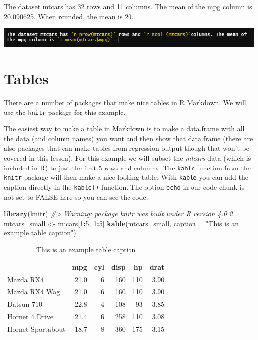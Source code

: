 \documentclass[
  12pt,
]{book}
\newenvironment{Shaded}{\begin{snugshade}}{\end{snugshade}}
\newcommand{\CommentTok}[1]{\textcolor[rgb]{0.56,0.35,0.01}{\textit{#1}}}
\newcommand{\DataTypeTok}[1]{\textcolor[rgb]{0.13,0.29,0.53}{#1}}
\newcommand{\DecValTok}[1]{\textcolor[rgb]{0.00,0.00,0.81}{#1}}
\newcommand{\KeywordTok}[1]{\textcolor[rgb]{0.13,0.29,0.53}{\textbf{#1}}}
\newcommand{\NormalTok}[1]{#1}
\newcommand{\OperatorTok}[1]{\textcolor[rgb]{0.81,0.36,0.00}{\textbf{#1}}}
\newcommand{\StringTok}[1]{\textcolor[rgb]{0.31,0.60,0.02}{#1}}
\begin{document}
The dataset mtcars has 32 rows and 11 columns. The mean of the mpg column is 20.090625. When rounded, the mean is 20.

\includegraphics{images/inline_code.PNG}

\hypertarget{tables}{%
\section{Tables}\label{tables}}

There are a number of packages that make nice tables in R Markdown. We will use the \texttt{knitr} package for this example.

The easiest way to make a table in Markdown is to make a data.frame with all the data (and column names) you want and then show that data.frame (there are also packages that can make tables from regression output though that won't be covered in this lesson). For this example we will subset the \emph{mtcars} data (which is included in R) to just the first 5 rows and columns. The \texttt{kable} function from the \texttt{knitr} package will then make a nice looking table. With \texttt{kable} you can add the caption directly in the \texttt{kable()} function. The option \texttt{echo} in our code chunk is not set to FALSE here so you can see the code.

\begin{Shaded}
\begin{Highlighting}[]
\KeywordTok{library}\NormalTok{(knitr)}
\CommentTok{\#> Warning: package \textquotesingle{}knitr\textquotesingle{} was built under R version 4.0.2}
\NormalTok{mtcars\_small <{-}}\StringTok{ }\NormalTok{mtcars[}\DecValTok{1}\OperatorTok{:}\DecValTok{5}\NormalTok{, }\DecValTok{1}\OperatorTok{:}\DecValTok{5}\NormalTok{]}
\KeywordTok{kable}\NormalTok{(mtcars\_small, }\DataTypeTok{caption =} \StringTok{"This is an example table caption"}\NormalTok{)}
\end{Highlighting}
\end{Shaded}

\begin{table}

\caption{\label{tab:unnamed-chunk-1}This is an example table caption}
\centering
\begin{tabular}[t]{l|r|r|r|r|r}
\hline
  & mpg & cyl & disp & hp & drat\\
\hline
Mazda RX4 & 21.0 & 6 & 160 & 110 & 3.90\\
\hline
Mazda RX4 Wag & 21.0 & 6 & 160 & 110 & 3.90\\
\hline
Datsun 710 & 22.8 & 4 & 108 & 93 & 3.85\\
\hline
Hornet 4 Drive & 21.4 & 6 & 258 & 110 & 3.08\\
\hline
Hornet Sportabout & 18.7 & 8 & 360 & 175 & 3.15\\
\hline
\end{tabular}
\end{table}
\end{document}
